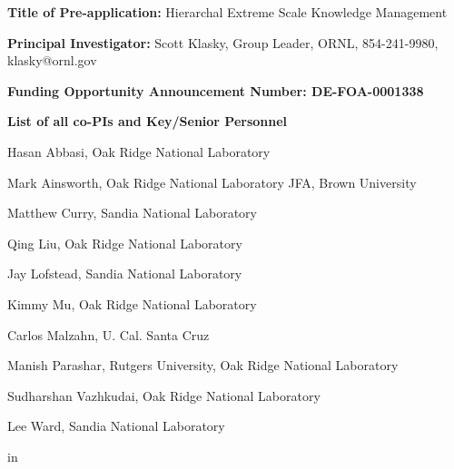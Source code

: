 \documentclass[11pt,letterpaper]{article}
\begin{document}

% 









%

{\bf Title of Pre-application:} Hierarchal Extreme Scale Knowledge Management \par
{\bf Principal Investigator:} Scott Klasky, Group Leader, ORNL, 854-241-9980, klasky@ornl.gov \par
{\bf Funding Opportunity Announcement Number: DE-FOA-0001338} \par
{\bf List of all co-PIs and Key/Senior Personnel} \par
Hasan Abbasi, Oak Ridge National Laboratory \par
Mark Ainsworth, Oak Ridge National Laboratory JFA, Brown University \par
Matthew Curry, Sandia National Laboratory\par
Qing Liu, Oak Ridge National Laboratory \par
Jay Lofstead, Sandia National Laboratory \par
Kimmy Mu, Oak Ridge National Laboratory \par
Carlos Malzahn, U. Cal. Santa Cruz \par
Manish Parashar, Rutgers University, Oak Ridge National Laboratory \par
Sudharshan Vazhkudai, Oak Ridge National Laboratory \par
Lee Ward, Sandia National Laboratory \par
{} in
\end{document}
